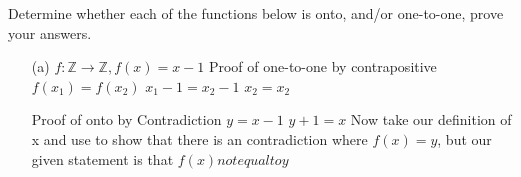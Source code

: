 \documentclass[10pt]{exam}
\begin{document}
\begin{questions}

\question[10] Determine whether each of the functions below is
onto, and/or one-to-one, prove your answers.
\begin{enumerate}
 \item[(a)] $f: \mathbb{Z} \rightarrow \mathbb{Z}, f(x) = x - 1$
 \newline Proof of one-to-one by contrapositive
 \newline $f(x_1) = f(x_2)$
 \newline $x_1 - 1 = x_2 -1$
 \newline $x_2 = x_2$
 
 \newline Proof of onto by Contradiction
 \newline $y=x-1$
 \newline $y+1=x$
 \newline Now take our definition of x and use to show that there is an contradiction where $f(x) = y$, but our given statement is that $f(x) not equal to y$
 

\end{enumerate}
\end{questions}
\end{document}
